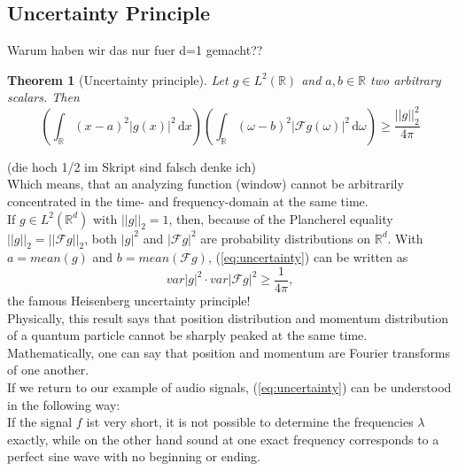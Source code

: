 \documentclass[a4paper, 11pt]{scrreprt}
\newtheorem{theorem}[defi]{Theorem}
\newcommand{\RR}{\mathbb{R}}
\newcommand{\FF}{\mathcal{F}}
\begin{document}
\subsection{Uncertainty Principle}
Warum haben wir das nur fuer d=1 gemacht??
\begin{theorem}[Uncertainty principle]
Let \(g\in L^2(\RR) \) and \(a,b \in\RR\) two arbitrary scalars. Then
\begin{equation}
\label{eq:uncertainty}
\left(\int_{\RR} (x-a)^2|g(x)|^2 \,\mathrm{d}x\right)\left(\int_{\RR}(\omega-b)^2|\FF g(\omega)|^2\,\mathrm{d}\omega\right) \geq \frac{||g||_2^2}{4\pi}
\end{equation}
\end{theorem}
(die hoch 1/2 im Skript sind falsch denke ich)\\
Which means, that an analyzing function (window) cannot be arbitrarily concentrated in the time- and frequency-domain at the same time.\\
If \(g\in L^2(\RR^d)\) with \(||g||_2=1\), then, because of the Plancherel equality \(||g||_2=||\FF g||_2\), both \(|g|^2\) and \(|\FF g|^2\) are probability distributions on \(\RR^d\). With \(a=mean(g)\) and \(b=mean(\FF g)\), (\ref{eq:uncertainty}) can be written as
	\[var|g|^2 \cdot var|\FF g|^2 \geq \frac{1}{4\pi},\]
the famous Heisenberg uncertainty principle!\\	
Physically, this result says that position distribution and momentum distribution of a quantum particle cannot be sharply peaked at the same time. Mathematically, one can say that position and momentum are Fourier transforms of one another.\\
If we return to our example of audio signals, (\ref{eq:uncertainty}) can be understood in the following way:\\
If the signal \(f\) ist very short, it is not possible to determine the frequencies \(\lambda\) exactly, while on the other hand sound at one exact frequency corresponds to a perfect sine wave with no beginning or ending.

\nocite{marks02}
\nocite{fornasier03}



\end{document}
